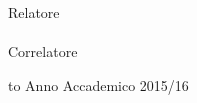 \begin{titlepage}
\begin{center}
\vspace{3.0truecm}
\large
\begin{flushright}
Relatore \\
{}
\\
\vspace{1truecm}
Correlatore \\
{}
\end{flushright}

\vspace{0,8truecm}

\hbox to \textwidth{\hrulefill}
\Large
Anno Accademico 2015/16
\end{center}
\end{titlepage}

\thispagestyle{empty}
\cleardoublepage
